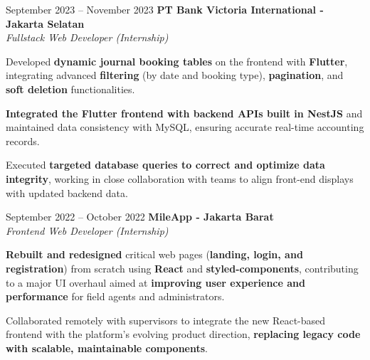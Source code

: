 \documentclass[../main.tex]{subfiles}
\begin{document}
\vspace{0.4 cm}

\begin{twocolentry}{
		September 2023 – November 2023}
	\textbf{PT Bank Victoria International \color{Gray} - Jakarta Selatan}\\
	\textit{Fullstack Web Developer (Internship)}
\end{twocolentry}

\vspace{0.10 cm}
\begin{onecolentry}
	\begin{highlights}
  \item Developed \textbf{dynamic journal booking tables} on the frontend with \textbf{Flutter}, integrating advanced \textbf{filtering} (by date and booking type), \textbf{pagination}, and \textbf{soft deletion} functionalities.
  \item \textbf{Integrated the Flutter frontend with backend APIs built in NestJS} and maintained data consistency with MySQL, ensuring accurate real-time accounting records.
  \item Executed \textbf{targeted database queries to correct and optimize data integrity}, working in close collaboration with teams to align front-end displays with updated backend data.
	\end{highlights}
\end{onecolentry}

\vspace{0.4 cm}

\begin{twocolentry}{
		September 2022 – October 2022}
	\textbf{MileApp \color{Gray} - Jakarta Barat}\\
	\textit{Frontend Web Developer (Internship)}
\end{twocolentry}

\vspace{0.10 cm}
\begin{onecolentry}
	\begin{highlights}
  \item \textbf{Rebuilt and redesigned} critical web pages (\textbf{landing, login, and registration}) from scratch using \textbf{React} and \textbf{styled-components}, contributing to a major UI overhaul aimed at \textbf{improving user experience and performance} for field agents and administrators.
  \item Collaborated remotely with supervisors to integrate the new React-based frontend with the platform’s evolving product direction, \textbf{replacing legacy code with scalable, maintainable components}.
	\end{highlights}
\end{onecolentry}
\end{document}
